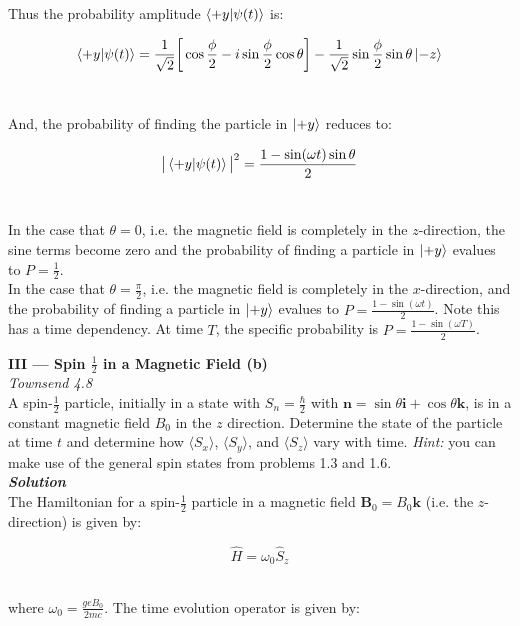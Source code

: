 \documentclass[14pt]{extarticle}
\renewcommand{\v}[1]{{\bm #1}}
\newcommand{\bfit}[1]{\textbf{\textit{#1}}}
\begin{document}
Thus the probability amplitude $\bra{+y}\ket{\psi(t)}$ is:

$$\bra{+y}\ket{\psi(t)} = \frac{1}{\sqrt 2} \bigg[ \cos \frac \phi 2 - i\sin\frac \phi 2 \cos\theta \bigg] - \frac{1}{\sqrt 2} \sin\frac \phi 2 \sin\theta \ket{-z}$$ \ 

And, the probability of finding the particle in $\ket{+y}$ reduces to: 

$$\big| \bra{+y}\ket{\psi(t)} \big|^2 = \frac{1 - \sin(\omega t)\sin\theta}{2}$$ \ 

In the case that $\theta = 0$, i.e. the magnetic field is completely in the $z$-direction, the sine terms become zero and the probability of finding a particle in $\ket{+y}$ evalues to $P = \frac 12$. \\ 

In the case that $\theta = \frac \pi 2$, i.e. the magnetic field is completely in the $x$-direction, and the probability of finding a particle in $\ket{+y}$ evalues to $P = \frac{1 - \sin(\omega t)}{2}$. Note this has a time dependency. At time $T$, the specific probability is $P = \frac{1 - \sin(\omega T)}{2}$. \\  









\hrulefill 

\hfill

{\bf \LARGE III --- Spin $\frac 12$ in a Magnetic Field (b)} \\ 

{\it Townsend 4.8} \\ 
A spin-$\frac 12$ particle, initially in a state with $S_n = \frac \hbar 2$ with $\v n = \sin\theta \v i + \cos\theta \v k$, is in a constant magnetic field $B_0$ in the $z$ direction. Determine the state of the particle at time $t$ and determine how $\langle S_x \rangle$, $\langle S_y \rangle$, and $\langle S_z \rangle$ vary with time. {\it Hint:} you can make use of the general spin states from problems 1.3 and 1.6. \\ 

{\bfit{Solution}} \\ 
The Hamiltonian for a spin-$\frac 12$ particle in a magnetic field $\v B_0 = B_0 \v k$ (i.e. the $z$-direction) is given by:

$$\hat H = \omega_0 \hat S_z$$ \ 

where $\omega_0 = \frac{geB_0}{2mc}$. The time evolution operator is given by:
\end{document}
